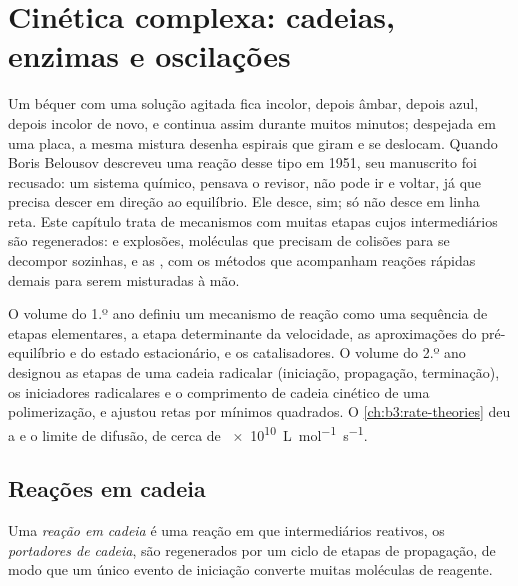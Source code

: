 \chapter{Cinética complexa: cadeias, enzimas e oscilações}\label{ch:b3:complex-kinetics}

Um béquer com uma solução agitada fica incolor, depois âmbar, depois azul,
depois incolor de novo, e continua assim durante muitos minutos; despejada em
uma placa, a mesma mistura desenha espirais que giram e se deslocam. Quando
Boris Belousov descreveu uma reação desse tipo em 1951, seu manuscrito foi
recusado: um sistema químico, pensava o revisor, não pode ir e voltar, já que
precisa descer em direção ao equilíbrio. Ele desce, sim; só não desce em linha
reta. Este capítulo trata de mecanismos com muitas etapas cujos intermediários
são regenerados:  e explosões, moléculas que precisam de
colisões para se decompor sozinhas,  e as , com os
métodos que acompanham reações rápidas demais para serem misturadas à mão.

\begin{recall}
O volume do 1.º ano definiu um mecanismo de reação como uma sequência de etapas
elementares, a etapa determinante da velocidade, as aproximações do
pré-equilíbrio e do estado estacionário, e os catalisadores. O volume do 2.º ano
designou as etapas de uma cadeia radicalar (iniciação, propagação, terminação),
os iniciadores radicalares e o comprimento de cadeia cinético de uma
polimerização, e ajustou retas por mínimos quadrados. O
\cref{ch:b3:rate-theories} deu a  e o limite de
difusão, de cerca de \qty{e10}{L.mol^{-1}.s^{-1}}.
\end{recall}

\section{Reações em cadeia}

\begin{definition}\label{def:b3:complex-kinetics:chain}
Uma \emph{reação em cadeia} é uma reação em que
intermediários reativos, os \emph{portadores de cadeia}, são
regenerados por um ciclo de etapas de propagação, de modo que um único evento de
iniciação converte muitas moléculas de reagente.
\end{definition}

